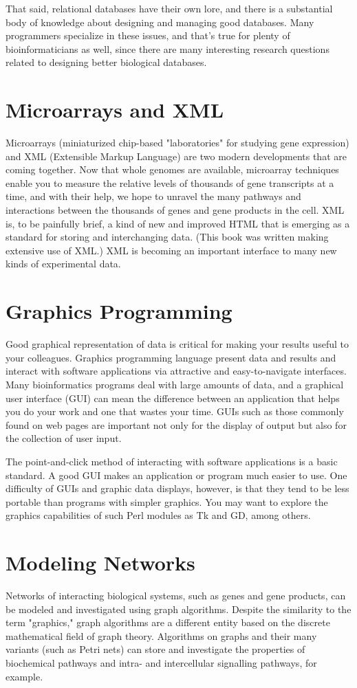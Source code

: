 That said, relational databases have their own lore, and there is a substantial body of knowledge about designing and managing good databases. Many programmers specialize in these issues, and that's true for plenty of bioinformaticians as well, since there are many interesting research questions related to designing better biological databases. 

\section{Microarrays and XML}
Microarrays (miniaturized chip-based "laboratories" for studying gene expression) and XML (Extensible Markup Language) are two modern developments that are coming together. Now that whole genomes are available, microarray techniques enable you to measure the relative levels of thousands of gene transcripts at a time, and with their help, we hope to unravel the many pathways and interactions between the thousands of genes and gene products in the cell. XML is, to be painfully brief, a kind of new and improved HTML that is emerging as a standard for storing and interchanging data. (This book was written making extensive use of XML.) XML is becoming an important interface to many new kinds of experimental data. 

\section{Graphics Programming}
Good graphical representation of data is critical for making your results useful to your colleagues. Graphics programming language present data and results and interact with software applications via attractive and easy-to-navigate interfaces. Many bioinformatics programs deal with large amounts of data, and a graphical user interface (GUI) can mean the difference between an application that helps you do your work and one that wastes your time. GUIs such as those commonly found on web pages are important not only for the display of output but also for the collection of user input.

The point-and-click method of interacting with software applications is a basic standard. A good GUI makes an application or program much easier to use. One difficulty of GUIs and graphic data displays, however, is that they tend to be less portable than programs with simpler graphics.  You may want to explore the graphics capabilities of such Perl modules as Tk and GD, among others. 

\section{Modeling Networks}
Networks of interacting biological systems, such as genes and gene products, can be modeled and investigated using graph algorithms.  Despite the similarity to the term "graphics," graph algorithms are a different entity based on the discrete mathematical field of graph theory. Algorithms on graphs and their many variants (such as Petri nets) can store and investigate the properties of biochemical pathways and intra- and intercellular signalling pathways, for example.

